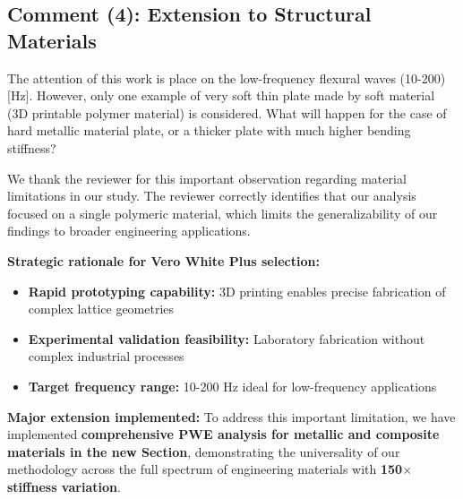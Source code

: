 \documentclass[11pt,a4paper]{article}
\newenvironment{reviewerbox}{%
    \par\medskip\noindent{\color{reviewercolor}\rule{\linewidth}{2pt}}\par
    \noindent{\color{reviewercolor}\bfseries Reviewer Comment}\par\smallskip
}{%
    \par\noindent{\color{reviewercolor}\rule{\linewidth}{0.5pt}}\medskip
}
\newenvironment{responsebox}{%
    \par\medskip\noindent{\color{responsecolor}\rule{\linewidth}{2pt}}\par
    \noindent{\color{responsecolor}\bfseries Response}\par\smallskip
}{%
    \par\noindent{\color{responsecolor}\rule{\linewidth}{0.5pt}}\medskip
}
\begin{document}
\newpage

\subsection*{Comment (4): Extension to Structural Materials}

\begin{reviewerbox}
The attention of this work is place on the low-frequency flexural waves (10-200)[Hz]. However, only one example of very soft thin plate made by soft material (3D printable polymer material) is considered. What will happen for the case of hard metallic material plate, or a thicker plate with much higher bending stiffness?
\end{reviewerbox}

\begin{responsebox}
We thank the reviewer for this important observation regarding material limitations in our study. The reviewer correctly identifies that our analysis focused on a single polymeric material, which limits the generalizability of our findings to broader engineering applications.

\textbf{Strategic rationale for Vero White Plus selection:}
\begin{itemize}
    \item \textbf{Rapid prototyping capability:} 3D printing enables precise fabrication of complex lattice geometries
    \item \textbf{Experimental validation feasibility:} Laboratory fabrication without complex industrial processes
    \item \textbf{Target frequency range:} 10-200 Hz ideal for low-frequency applications
\end{itemize}

\textbf{Major extension implemented:} To address this important limitation, we have implemented \textbf{comprehensive PWE analysis for metallic and composite materials in the new Section}, demonstrating the universality of our methodology across the full spectrum of engineering materials with \textbf{150$\times$ stiffness variation}.
\end{responsebox}
\end{document}

